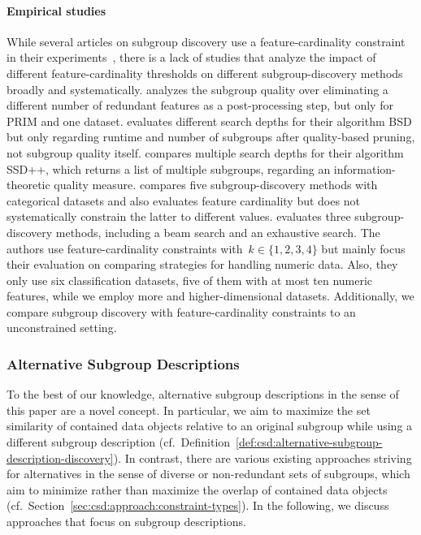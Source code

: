 \documentclass{article}
\theoremstyle{definition}
\begin{document}
\paragraph{Empirical studies}

While several articles on subgroup discovery use a feature-cardinality constraint in their experiments~\cite{arzamasov2022pedagogical, mampaey2012efficient, lavrac2006relevancy, leeuwen2012diverse, leeuwen2013discovering}, there is a lack of studies that analyze the impact of different feature-cardinality thresholds on different subgroup-discovery methods broadly and systematically.
\cite{friedman1999bump} analyzes the subgroup quality over eliminating a different number of redundant features as a post-processing step, but only for PRIM and one dataset.
\cite{lemmerich2010fast} evaluates different search depths for their algorithm BSD but only regarding runtime and number of subgroups after quality-based pruning, not subgroup quality itself.
\cite{proencca2022robust} compares multiple search depths for their algorithm SSD++, which returns a list of multiple subgroups, regarding an information-theoretic quality measure.
\cite{helal2016subgroup} compares five subgroup-discovery methods with categorical datasets and also evaluates feature cardinality but does not systematically constrain the latter to different values.
\cite{meeng2021real} evaluates three subgroup-discovery methods, including a beam search and an exhaustive search.
The authors use feature-cardinality constraints with~$k \in \{1, 2, 3, 4\}$ but mainly focus their evaluation on comparing strategies for handling numeric data.
Also, they only use six classification datasets, five of them with at most ten numeric features, while we employ more and higher-dimensional datasets.
Additionally, we compare subgroup discovery with feature-cardinality constraints to an unconstrained setting.

\subsubsection{Alternative Subgroup Descriptions}
\label{sec:csd:related-work:subgroup-discovery:alternatives}

To the best of our knowledge, alternative subgroup descriptions in the sense of this paper are a novel concept.
In particular, we aim to maximize the set similarity of contained data objects relative to an original subgroup while using a different subgroup description (cf.~Definition~\ref{def:csd:alternative-subgroup-description-discovery}).
In contrast, there are various existing approaches striving for alternatives in the sense of diverse or non-redundant sets of subgroups, which aim to minimize rather than maximize the overlap of contained data objects~\cite{atzmueller2015subgroup} (cf.~Section~\ref{sec:csd:approach:constraint-types}).
In the following, we discuss approaches that focus on subgroup descriptions.
\end{document}
